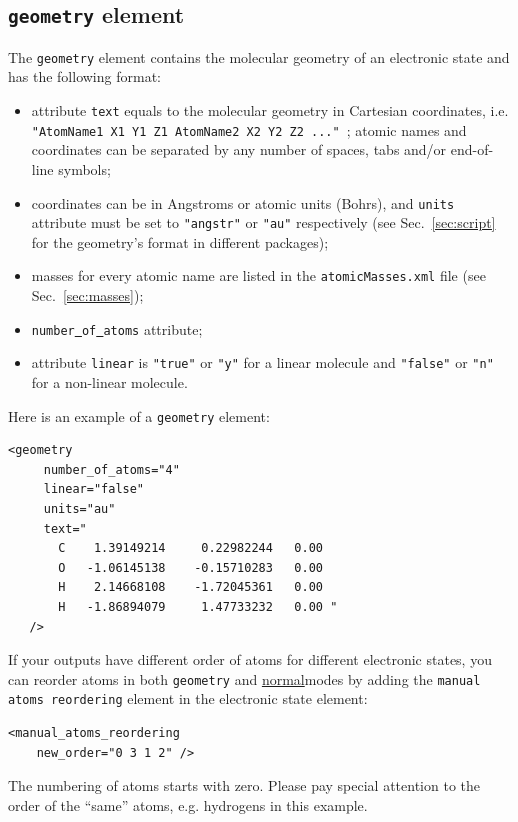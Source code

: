 \documentclass[11pt]{article}
\begin{document}
\subsection{\texttt{geometry} element}
\label{sec:geometry}

The {\tt geometry} element contains the molecular geometry of an electronic state and has the following format:
\begin{itemize}
\item attribute {\tt text} equals to the molecular geometry in Cartesian coordinates, i.e. {\tt "AtomName1 X1 Y1 Z1    AtomName2 X2 Y2 Z2 ..." };
atomic names and coordinates can be separated by any number of spaces, tabs and/or end-of-line symbols;
\item coordinates can be in Angstroms or atomic units (Bohrs), and {\tt units} attribute
must be set to {\tt "angstr"} or {\tt "au"} respectively (see Sec.~\ref{sec:script} for the geometry's format in different \ai packages);
\item masses for every atomic name are listed in the {\tt atomicMasses.xml} file (see Sec.~\ref{sec:masses});
\item {\tt number\underline{~}of\underline{~}atoms} attribute; 
\item attribute {\tt linear} is {\tt "true"} or {\tt "y"} for a linear molecule 
and {\tt "false"} or {\tt "n"} for a non-linear molecule.
\end{itemize}

Here is an example of a {\tt geometry} element:
\begin{lstlisting}[frame=single,framerule=0pt]
  <geometry 
     number_of_atoms="4" 
     linear="false" 
     units="au"
     text=" 
       C    1.39149214     0.22982244   0.00
       O   -1.06145138    -0.15710283   0.00
       H    2.14668108    -1.72045361   0.00
       H   -1.86894079     1.47733232   0.00 "
   />
\end{lstlisting}

If your \ai outputs have different order of atoms for different electronic states, 
you can reorder atoms in both {\tt geometry} and \ul{normal}{modes} by adding 
the {\tt manual atoms reordering} element in the electronic state element:
\begin{lstlisting}[frame=single,framerule=0pt]
 <manual_atoms_reordering 
    new_order="0 3 1 2" />
\end{lstlisting}
The numbering of atoms starts with zero. 
Please pay special attention to the order of the ``same'' atoms, e.g. hydrogens in this example.
\end{document}
